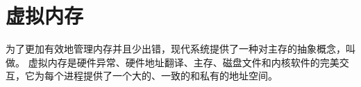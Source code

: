 
\chapter{虚拟内存}
{
    为了更加有效地管理内存并且少出错，现代系统提供了一种对主存的抽象概念，叫做。
    虚拟内存是硬件异常、硬件地址翻译、主存、磁盘文件和内核软件的完美交互，它为每个进程提供了一个大的、一致的和私有的地址空间。
}

\cleardoublepage

\endinput
